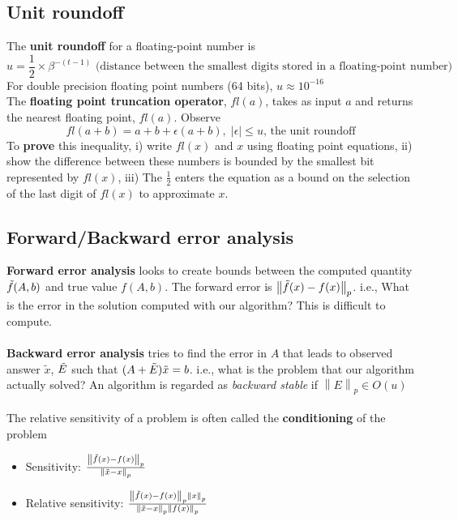 \documentclass{article}
\newcommand{\norm}[2]{\left\lVert#1\right\rVert_#2}
\newcommand{\abs}[1]{\lvert#1\rvert}
\begin{document}
\subsection{Unit roundoff}
The \textbf{unit roundoff} for a floating-point number is 
\begin{equation*}
    u = \frac{1}{2} \times \beta^{-(t-1)} \textrm{ (distance between the smallest digits stored in a floating-point number)}
\end{equation*}
For double precision floating point numbers (64 bits), $u \approx 10^{-16}$\\
The \textbf{floating point truncation operator}, $fl(a)$, takes as input $a$ and returns the nearest floating point, $fl(a)$. Observe
\begin{equation*}
    fl(a+b) = a+b + \epsilon(a+b), \; \abs{\epsilon} \leq u \textrm{, the unit roundoff}
\end{equation*}
To \textbf{prove} this inequality, i) write $fl(x)$ and $x$ using floating point equations, ii) show the difference between these numbers is bounded by the smallest bit represented by $fl(x)$, iii) The $\frac{1}{2}$ enters the equation as a bound on the selection of the last digit of $fl(x)$ to approximate $x$.

\subsection{Forward/Backward error analysis}
\textbf{Forward error analysis} looks to create bounds between the computed quantity $\Tilde{f}(A, b)$ and true value $f(A,b)$. The forward error is $\norm{\Tilde{f}(x) - f(x)}{p}$. i.e., What is the error in the solution computed with our algorithm? This is difficult to compute.\\ \\
\textbf{Backward error analysis} tries to find the error in $A$ that leads to observed answer $\tilde{x}$, $\Tilde{E}$ such that $(A + \Tilde{E})\tilde{x} = b$. i.e., what is the problem that our algorithm actually solved? An algorithm is regarded as \textit{backward stable} if $\norm{E}{p} \in O(u)$ \\ \\ 
The relative sensitivity of a problem is often called the \textbf{conditioning} of the problem
\begin{itemize}
    \item Sensitivity: $\frac{\norm{\Tilde{f}(x) - f(x)}{p}}{\norm{\Tilde{x} - x}{p}}$
    \item Relative sensitivity: $\frac{\norm{\Tilde{f}(x) - f(x)}{p}\norm{x}{p}}{\norm{\Tilde{x} - x}{p}\norm{f(x)}{p}}$
\end{itemize}
\end{document}
